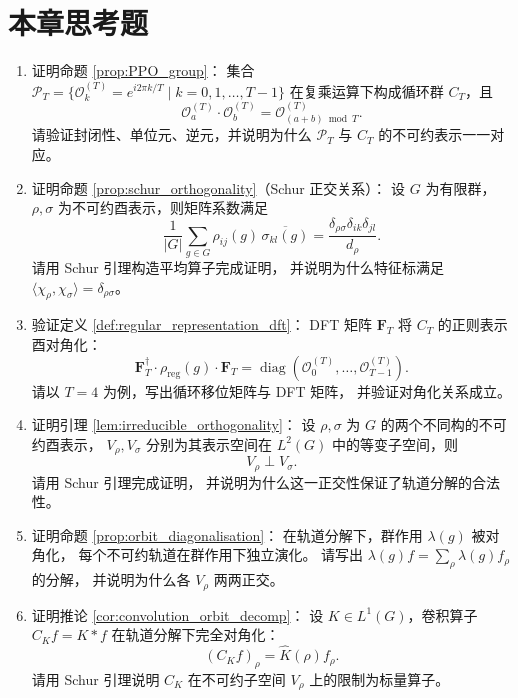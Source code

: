 \section*{本章思考题}

\begin{enumerate}[leftmargin=3em, label=\textbf{题 \arabic*}]
    \item 证明命题 \ref{prop:PPO_group}：
    集合 $\mathcal{P}_T=\{\mathcal{O}_k^{(T)}=e^{i2\pi k/T}\mid k=0,1,\dots,T-1\}$
    在复乘运算下构成循环群 $C_T$，且
    \[
    \mathcal{O}_a^{(T)}\cdot\mathcal{O}_b^{(T)}=\mathcal{O}_{(a+b)\bmod T}^{(T)}.
    \]
    请验证封闭性、单位元、逆元，并说明为什么 $\mathcal{P}_T$ 与 $C_T$ 的不可约表示一一对应。

    \item 证明命题 \ref{prop:schur_orthogonality}（Schur 正交关系）：
    设 $G$ 为有限群，$\rho,\sigma$ 为不可约酉表示，则矩阵系数满足
    \[
    \frac{1}{|G|}\sum_{g\in G}\rho_{ij}(g)\,\overline{\sigma_{kl}(g)}
    =\frac{\delta_{\rho\sigma}\delta_{ik}\delta_{jl}}{d_\rho}.
    \]
    请用 Schur 引理构造平均算子完成证明，
    并说明为什么特征标满足 $\langle\chi_\rho,\chi_\sigma\rangle=\delta_{\rho\sigma}$。

    \item 验证定义 \ref{def:regular_representation_dft}：
    DFT 矩阵 $\mathbf{F}_T$ 将 $C_T$ 的正则表示酉对角化：
    \[
    \mathbf{F}_T^\dagger\cdot\rho_{\text{reg}}(g)\cdot\mathbf{F}_T
    =\operatorname{diag}(\mathcal{O}_0^{(T)},\dots,\mathcal{O}_{T-1}^{(T)}).
    \]
    请以 $T=4$ 为例，写出循环移位矩阵与 DFT 矩阵，
    并验证对角化关系成立。

    \item 证明引理 \ref{lem:irreducible_orthogonality}：
    设 $\rho,\sigma$ 为 $G$ 的两个不同构的不可约酉表示，
    $V_\rho,V_\sigma$ 分别为其表示空间在 $L^2(G)$ 中的等变子空间，则
    \[
    V_\rho\perp V_\sigma.
    \]
    请用 Schur 引理完成证明，
    并说明为什么这一正交性保证了轨道分解的合法性。

    \item 证明命题 \ref{prop:orbit_diagonalisation}：
    在轨道分解下，群作用 $\lambda(g)$ 被对角化，
    每个不可约轨道在群作用下独立演化。
    请写出 $\lambda(g)f=\sum_\rho\lambda(g)f_\rho$ 的分解，
    并说明为什么各 $V_\rho$ 两两正交。

    \item 证明推论 \ref{cor:convolution_orbit_decomp}：
    设 $K\in L^1(G)$，卷积算子 $C_Kf=K*f$ 在轨道分解下完全对角化：
    \[
    (C_Kf)_\rho=\hat{K}(\rho)f_\rho.
    \]
    请用 Schur 引理说明 $C_K$ 在不可约子空间 $V_\rho$ 上的限制为标量算子。


\end{enumerate}
